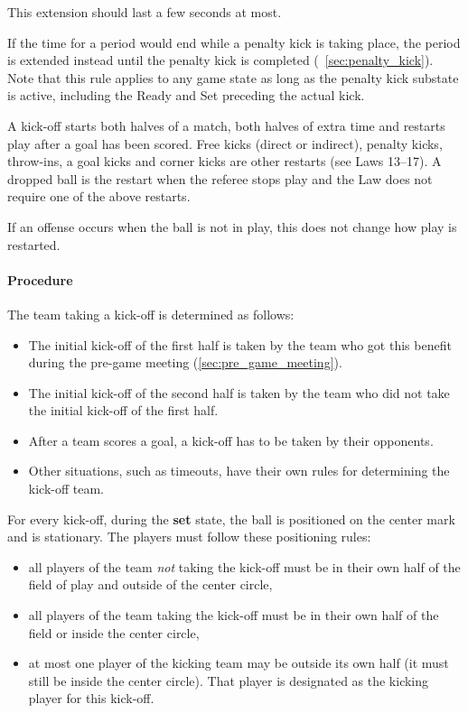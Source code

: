 This extension should last a few seconds at most.

\label{sec:penalty_kick_extension}

If the time for a period would end while a penalty kick is taking place, the period is extended instead until the penalty kick is completed (\cf~\cref{sec:penalty_kick}). Note that this rule applies to any game state as long as the penalty kick substate is active, including the Ready and Set preceding the actual kick.

\label{sec:start_restart_play}

A kick-off starts both halves of a match, both halves of extra time and restarts play after a goal has been scored. Free kicks (direct or indirect), penalty kicks,
throw-ins, a goal kicks and corner kicks are other restarts (see Laws 13–17).
A dropped ball is the restart when the referee stops play and the Law does not
require one of the above restarts.

If an offense occurs when the ball is not in play, this does not change how
play is restarted.

\label{sec:kick_off}

\paragraph{Procedure}

The team taking a kick-off is determined as follows:
\begin{itemize}
    \item The initial kick-off of the first half is taken by the team who got this benefit during the pre-game meeting (\cf \ref{sec:pre_game_meeting}).
    \item The initial kick-off of the second half is taken by the team who did not take the initial kick-off of the first half.
    \item After a team scores a goal, a kick-off has to be taken by their opponents.
    \item Other situations, such as timeouts, have their own rules for determining the kick-off team.
\end{itemize}

For every kick-off, during the \textbf{set} state, the ball is positioned on the center mark and is stationary. The players must follow these positioning rules:
\begin{itemize}
    \item all players of the team \textit{not} taking the kick-off must be in their own half of the field of play and outside of the center circle,

    \item all players of the team taking the kick-off must be in their own half of the field or inside the center circle,

    \item at most one player of the kicking team may be outside its own half (it must still be inside the center circle). That player is designated as the kicking player for this kick-off.
\end{itemize}

